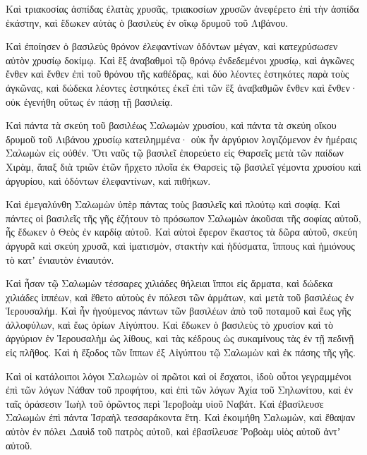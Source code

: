 {Καὶ τριακοσίας ἀσπίδας ἐλατὰς χρυσᾶς, τριακοσίων χρυσῶν ἀνεφέρετο ἐπὶ τὴν ἀσπίδα ἑκάστην, καὶ ἔδωκεν αὐτὰς ὁ βασιλεὺς ἐν οἴκῳ δρυμοῦ τοῦ Λιβάνου.
\par }{\PP {}Καὶ ἐποίησεν ὁ βασιλεὺς θρόνον ἐλεφαντίνων ὀδόντων μέγαν, καὶ κατεχρύσωσεν αὐτὸν χρυσίῳ δοκίμῳ.
Καὶ ἓξ ἀναβαθμοὶ τῷ θρόνῳ ἐνδεδεμένοι χρυσίῳ, καὶ ἀγκῶνες ἔνθεν καὶ ἔνθεν ἐπὶ τοῦ θρόνου τῆς καθέδρας, καὶ δύο λέοντες ἑστηκότες παρὰ τοὺς ἀγκῶνας,
καὶ δώδεκα λέοντες ἑστηκότες ἐκεῖ ἐπὶ τῶν ἓξ ἀναβαθμῶν ἔνθεν καὶ ἔνθεν· οὐκ ἐγενήθη οὕτως ἐν πάσῃ τῇ βασιλείᾳ.
\par }{\PP {}Καὶ πάντα τὰ σκεύη τοῦ βασιλέως Σαλωμὼν χρυσίου, καὶ πάντα τὰ σκεύη οἴκου δρυμοῦ τοῦ Λιβάνου χρυσίῳ κατειλημμένα· οὐκ ἦν ἀργύριον λογιζόμενον ἐν ἡμέραις Σαλωμὼν εἰς οὐθέν.
Ὅτι ναῦς τῷ βασιλεῖ ἐπορεύετο εἰς Θαρσεῖς μετὰ τῶν παίδων Χιρὰμ, ἅπαξ διὰ τριῶν ἐτῶν ἤρχετο πλοῖα ἐκ Θαρσεὶς τῷ βασιλεῖ γέμοντα χρυσίου καὶ ἀργυρίου, καὶ ὀδόντων ἐλεφαντίνων, καὶ πιθήκων.
\par }{\PP {}Καὶ ἐμεγαλύνθη Σαλωμὼν ὑπὲρ πάντας τοὺς βασιλεῖς καὶ πλούτῳ καὶ σοφίᾳ.
Καὶ πάντες οἱ βασιλεῖς τῆς γῆς ἐζήτουν τὸ πρόσωπον Σαλωμὼν ἀκοῦσαι τῆς σοφίας αὐτοῦ, ἧς ἔδωκεν ὁ Θεὸς ἐν καρδίᾳ αὐτοῦ.
Καὶ αὐτοὶ ἔφερον ἕκαστος τὰ δῶρα αὐτοῦ, σκεύη ἀργυρᾶ καὶ σκεύη χρυσᾶ, καὶ ἱματισμὸν, στακτὴν καὶ ἡδύσματα, ἵππους καὶ ἡμιόνους τὸ κατʼ ἐνιαυτὸν ἐνιαυτόν.
\par }{\PP {}Καὶ ἦσαν τῷ Σαλωμὼν τέσσαρες χιλιάδες θήλειαι ἵπποι εἰς ἅρματα, καὶ δώδεκα χιλιάδες ἱππέων, καὶ ἔθετο αὐτοὺς ἐν πόλεσι τῶν ἁρμάτων, καὶ μετὰ τοῦ βασιλέως ἐν Ἱερουσαλήμ.
Καὶ ἦν ἡγούμενος πάντων τῶν βασιλέων ἀπὸ τοῦ ποταμοῦ καὶ ἕως γῆς ἀλλοφύλων, καὶ ἕως ὁρίων Αἰγύπτου.
Καὶ ἔδωκεν ὁ βασιλεὺς τὸ χρυσίον καὶ τὸ ἀργύριον ἐν Ἱερουσαλὴμ ὡς λίθους, καὶ τὰς κέδρους ὡς συκαμίνους τὰς ἐν τῇ πεδινῇ εἰς πλῆθος.
Καὶ ἡ ἔξοδος τῶν ἵππων ἐξ Αἰγύπτου τῷ Σαλωμὼν καὶ ἐκ πάσης τῆς γῆς.
\par }{\PP {}Καὶ οἱ κατάλοιποι λόγοι Σαλωμὼν οἱ πρῶτοι καὶ οἱ ἔσχατοι, ἰδοὺ οὗτοι γεγραμμένοι ἐπὶ τῶν λόγων Νάθαν τοῦ προφήτου, καὶ ἐπὶ τῶν λόγων Ἀχία τοῦ Σηλωνίτου, καὶ ἐν ταῖς ὁράσεσιν Ἰωὴλ τοῦ ὁρῶντος περὶ Ἱεροβοὰμ υἱοῦ Ναβάτ.
Καὶ ἐβασίλευσε Σαλωμὼν ἐπὶ πάντα Ἰσραὴλ τεσσαράκοντα ἔτη.
Καὶ ἐκοιμήθη Σαλωμὼν, καὶ ἔθαψαν αὐτὸν ἐν πόλει Δαυὶδ τοῦ πατρὸς αὐτοῦ, καὶ ἐβασίλευσε Ῥοβοὰμ υἱὸς αὐτοῦ ἀντʼ αὐτοῦ.

}
